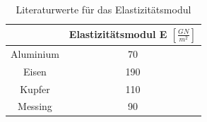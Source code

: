 \begin{table}[h]
	\caption{Literaturwerte für das Elastizitätsmodul}
	\begin{tabular}{|c|c|}
		\hline
		& Elastizitätsmodul E $\left[\frac{GN}{m^2}\right]$\\
		\hline
		Aluminium & 70 \\
		\hline
		Eisen & 190 \\
		\hline
		Kupfer & 110 \\
		\hline
		Messing & 90 \\
		\hline
	\end{tabular}
\label{tab:ElaLit}
\end{table}